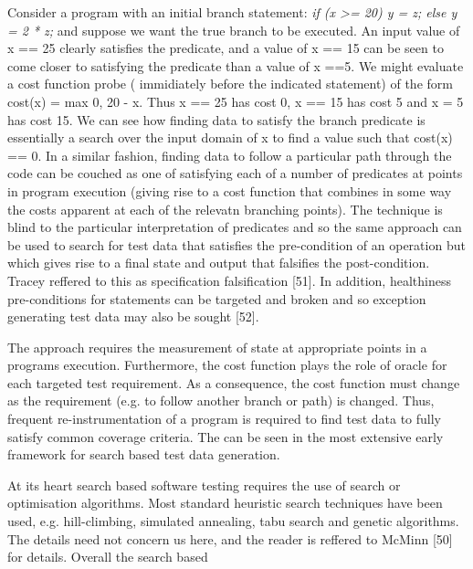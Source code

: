 Consider a program with an initial branch statement: 
{\it{ if (x >= 20) y = z; else y = 2 * z;}}
and suppose we want the true branch to be executed. An input value of x == 25 clearly satisfies the predicate, and a value of x == 15 can be seen to come closer to satisfying the predicate than a value of x ==5. We might evaluate a cost function probe ( immidiately before the indicated statement) of the form cost(x) = max {0, 20 - x}. Thus x == 25 has cost 0, x == 15 has cost 5 and x = 5 has cost 15. We can see how finding data to satisfy the branch predicate is essentially a search over the input domain of x to find a value such that cost(x) == 0. In a similar fashion, finding data to follow a particular path through the code can be couched as one of satisfying each of a number of predicates at points in program execution (giving rise to a cost function that combines in some way the costs apparent at each of the relevatn branching points).  The technique is blind to the particular interpretation of predicates and so the same approach can be used to search for test data that satisfies the pre-condition of an operation but which gives rise to a final state and output that falsifies the post-condition. Tracey reffered to this as specification falsification [51]. In addition, healthiness pre-conditions for statements can be targeted and broken and so exception generating test data may also be sought [52]. 

The approach requires the measurement of state at appropriate points in a programs execution. Furthermore, the cost function plays the role of oracle for each targeted test requirement. As a consequence, the cost function must change as the requirement (e.g. to follow another branch or path) is changed. Thus, frequent re-instrumentation of a program is required to find test data to fully satisfy common coverage criteria. The can be seen in the most extensive early framework for search based test data generation.

At its heart search based software testing requires the use of search or optimisation algorithms. Most standard heuristic search techniques have been used, e.g. hill-climbing, simulated annealing, tabu search and genetic algorithms. The details need not concern us here, and the reader is reffered to McMinn [50] for details. Overall the search based 





